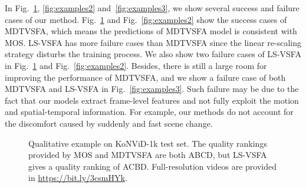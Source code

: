 \documentclass[twocolumn]{svjour3}          \smartqed  \usepackage{graphicx}
\begin{document}
In Fig.~\ref{fig:examples1}, \ref{fig:examples2} and~\ref{fig:examples3}, we show several success and failure cases of our method.
Fig.~\ref{fig:examples1} and Fig.~\ref{fig:examples2} show the success cases of MDTVSFA, which means the predictions of MDTVSFA model is consistent with MOS.
LS-VSFA has more failure cases than MDTVSFA since the linear re-scaling strategy disturbs the training process.
We also show two failure cases of LS-VSFA in Fig.~\ref{fig:examples1} and Fig.~\ref{fig:examples2}.
Besides, there is still a large room for improving the performance of MDTVSFA, and we show a failure case of both MDTVSFA and LS-VSFA in Fig.~\ref{fig:examples3}.
Such failure may be due to the fact that our models extract frame-level features and not fully exploit the motion and spatial-temporal information.
For example, our methods do not account for the discomfort caused by suddenly and fast scene change.

\begin{figure}[!htb]
\begin{center}
\hfill  
\hfill  
\hfill  
\hfill
\end{center}
  \caption{Qualitative example on KoNViD-1k test set. The quality rankings provided by MOS and MDTVSFA are both ABCD, but LS-VSFA gives a quality ranking of ACBD. Full-resolution videos are provided in \url{https://bit.ly/3csmHYk}.} 
 \label{fig:examples1}
\end{figure}
\end{document}
